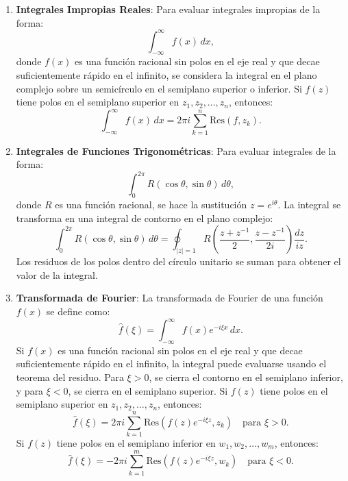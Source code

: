 \documentclass[main.tex]{subfiles}
\begin{document}
\begin{enumerate}
\item \textbf{Integrales Impropias Reales}:
Para evaluar integrales impropias de la forma:
\[
\int_{-\infty}^\infty f(x) \, dx,
\]
donde \(f(x)\) es una función racional sin polos en el eje real y que decae suficientemente rápido en el infinito, se considera la integral en el plano complejo sobre un semicírculo en el semiplano superior o inferior. Si \(f(z)\) tiene polos en el semiplano superior en \(z_1, z_2, \dots, z_n\), entonces:
\[
\int_{-\infty}^\infty f(x) \, dx = 2\pi i \sum_{k=1}^n \text{Res}(f, z_k).
\]

\item \textbf{Integrales de Funciones Trigonométricas}:
Para evaluar integrales de la forma:
\[
\int_0^{2\pi} R(\cos \theta, \sin \theta) \, d\theta,
\]
donde \(R\) es una función racional, se hace la sustitución \(z = e^{i\theta}\). La integral se transforma en una integral de contorno en el plano complejo:
\[
\int_0^{2\pi} R(\cos \theta, \sin \theta) \, d\theta = \oint_{|z|=1} R\left( \frac{z + z^{-1}}{2}, \frac{z - z^{-1}}{2i} \right) \frac{dz}{iz}.
\]
Los residuos de los polos dentro del círculo unitario se suman para obtener el valor de la integral.

\item \textbf{Transformada de Fourier}:
La transformada de Fourier de una función \(f(x)\) se define como:
\begin{equation}
\hat{f}(\xi) = \int_{-\infty}^\infty f(x) e^{-i \xi x} \, dx.
\end{equation}
Si \(f(x)\) es una función racional sin polos en el eje real y que decae suficientemente rápido en el infinito, la integral puede evaluarse usando el teorema del residuo. Para \(\xi > 0\), se cierra el contorno en el semiplano inferior, y para \(\xi < 0\), se cierra en el semiplano superior. Si \(f(z)\) tiene polos en el semiplano superior en \(z_1, z_2, \dots, z_n\), entonces:
\[
\hat{f}(\xi) = 2\pi i \sum_{k=1}^n \text{Res}(f(z) e^{-i \xi z}, z_k) \quad \text{para } \xi > 0.
\]
Si \(f(z)\) tiene polos en el semiplano inferior en \(w_1, w_2, \dots, w_m\), entonces:
\[
\hat{f}(\xi) = -2\pi i \sum_{k=1}^m \text{Res}(f(z) e^{-i \xi z}, w_k) \quad \text{para } \xi < 0.
\]
\end{enumerate}
\end{document}

